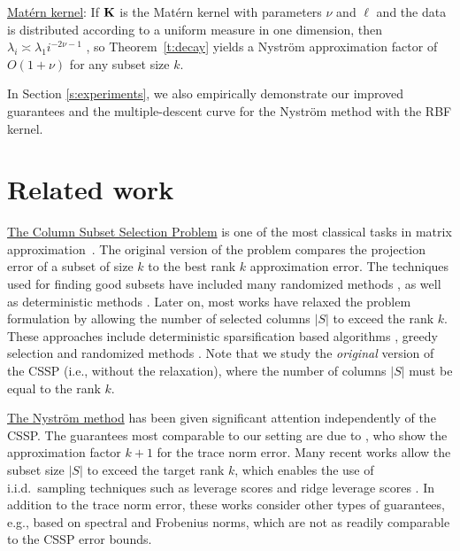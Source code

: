 \documentclass{article}
\begin{document}
  \underline{Mat\'ern kernel}: If $\mathbf K$ is the Mat\'ern kernel with
  parameters $\nu$ and $\ell$ and the data is distributed according to a
  uniform measure in one dimension,
  then $\lambda_i\asymp \lambda_1 i^{-2\nu-1}$
  \citep{RasmussenWilliams06}, so Theorem~\ref{t:decay} yields a
  Nystr\"om approximation factor of $O(1+\nu)$ for any subset size
  $k$.

In Section \ref{s:experiments}, we also empirically
demonstrate our improved guarantees and the multiple-descent curve for the Nystr\"om method with the
RBF kernel.


\section{Related work}
\label{s:related-work}
\underline{The Column Subset Selection Problem} is one of the most classical tasks
in matrix approximation~\citep{BoutsidisMD08}. The original version of the problem compares the
projection error of a subset of size $k$ to the best rank $k$
approximation error. The techniques used for finding good subsets have
included many randomized methods
\citep{pca-volume-sampling,BoutsidisMD08,dpp-for-cssp}, as well as deterministic
methods \citep{GuE96}. Later on, most works have relaxed the problem
formulation by allowing the number of selected columns $|S|$ to exceed
the rank $k$. These approaches include deterministic sparsification
based algorithms \citep{near-optimal-columns}, greedy selection
\citep[e.g.,][]{Bhaskara2016GreedyCSS} and randomized methods
\citep[e.g.,][]{Drineas08CUR,more-efficient-volume-sampling,Paul2015CSS}. Note that
we study the \emph{original} version of the CSSP (i.e., without the
relaxation), where the number of columns $|S|$ must be equal to the
rank $k$. 

\underline{The Nystr\"om method} has been given significant attention
independently of the CSSP. The guarantees most comparable to our
setting are due to \citet{belabbas-wolfe09}, who show the approximation
factor $k+1$ for the trace norm error. Many recent works allow the subset size $|S|$ to exceed
the target rank $k$, which enables the use of i.i.d.~sampling
techniques such as leverage scores \citep{revisiting-nystrom}
and ridge leverage scores \citep{ridge-leverage-scores,Musco17Nystrom}.
In addition to the trace norm error, these works consider other types
of guarantees, e.g., based on spectral and Frobenius norms, which are not 
as readily comparable to the CSSP error bounds.
\end{document}
